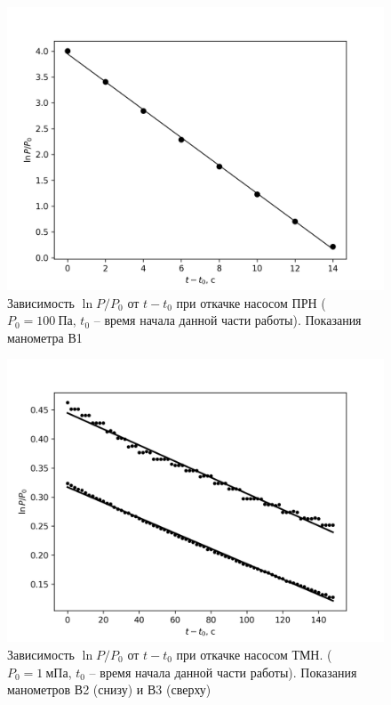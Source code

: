 \documentclass[14pt, a4paper]{report}
\begin{document}
\begin{figure}[!ht]
\centering
\includegraphics[scale=0.5]{terma5_4.png}
\caption{Зависимость $\ln P/P_0$ от $t-t_0$ при откачке насосом ПРН ($P_0=100\ Па$, $t_0$ -- время начала данной части работы). Показания манометра В1}
\end{figure}

\begin{figure}[!ht]
\centering
\includegraphics[scale=0.7]{terma5_5.png}
\caption{Зависимость $\ln P/P_0$ от $t-t_0$ при откачке насосом ТМН. ($P_0=1\ мПа$, $t_0$ -- время начала данной части работы). Показания манометров В2 (снизу) и В3 (сверху)}
\end{figure}
\end{document}
